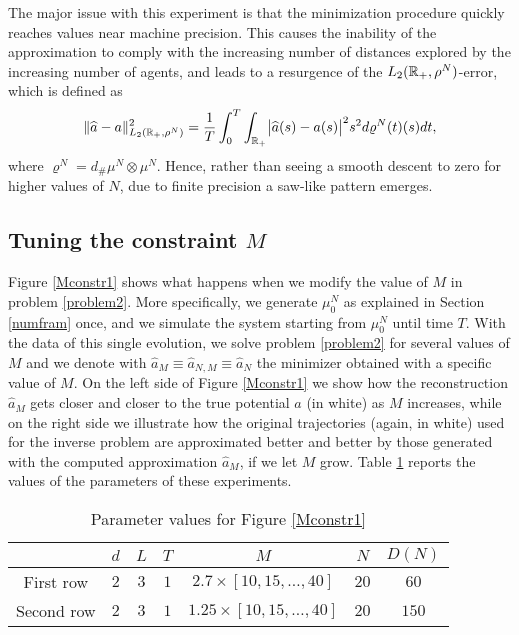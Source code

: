 The major issue with this experiment is that the minimization procedure quickly reaches values near machine precision. This causes the inability of the approximation to comply with the increasing number of distances explored by the increasing number of agents, and leads to a resurgence of the $L_2(\mathbb{R}_+,\rho^N)$-error, which is defined as
\begin{align}
	\|\widehat a-a\|^2_{L_2(\mathbb{R}_+,\rho^N)} = \frac{1}{T}\int_0^T\int_{\mathbb{R}_+}\bigl|\widehat a(s)-a(s)\bigr|^2 s^2 d\varrho^N(t)(s) dt,
\end{align}
where $\varrho^N = d_\# \mu^N \otimes \mu^N$.
Hence, rather than seeing a smooth descent to zero for higher values of $N$, due to finite precision a saw-like pattern emerges.

\subsection{Tuning the constraint $M$}

Figure \ref{Mconstr1} shows what happens when we modify the value of $M$ in problem \eqref{problem2}. More specifically, we generate $\mu^N_0$ as explained in Section \ref{numfram} once, and we simulate the system starting from $\mu^N_0$ until time $T$. With the data of this single evolution, we solve problem \eqref{problem2} for several values of $M$ and we denote with $\widehat{a}_M \equiv \widehat{a}_{N,M} \equiv \widehat{a}_{N}$ the minimizer obtained with a specific value of $M$. On the left side of Figure \ref{Mconstr1} we show how the reconstruction $\widehat{a}_M$ gets closer and closer to the true potential $a$ (in white) as $M$ increases, while on the right side we illustrate how the original trajectories (again, in white) used for the inverse problem are approximated better and better by those generated with the computed approximation $\widehat{a}_M$, if we let $M$ grow. Table \ref{tab:figM} reports the values of the parameters of these experiments.

\begin{table}[h]
\begin{center}
\begin{tabular}{ |c|c|c|c|c|c|c| }
\hline
 & $d$ & $L$ & $T$ & $M$ & $N$ & $D(N)$ \\
\hline
\hline
 First row & $2$ & $3$ & $1$ & $2.7 \times [10,15,\ldots,40]$ & $20$ & $60$ \\
\hline
 Second row & $2$ & $3$ & $1$ & $1.25 \times [10,15,\ldots,40]$ & $20$ & $150$ \\
\hline
\end{tabular}
\end{center}
\vspace{-0.5cm}
\caption{Parameter values for Figure \ref{Mconstr1}} \label{tab:figM} 
\end{table}

